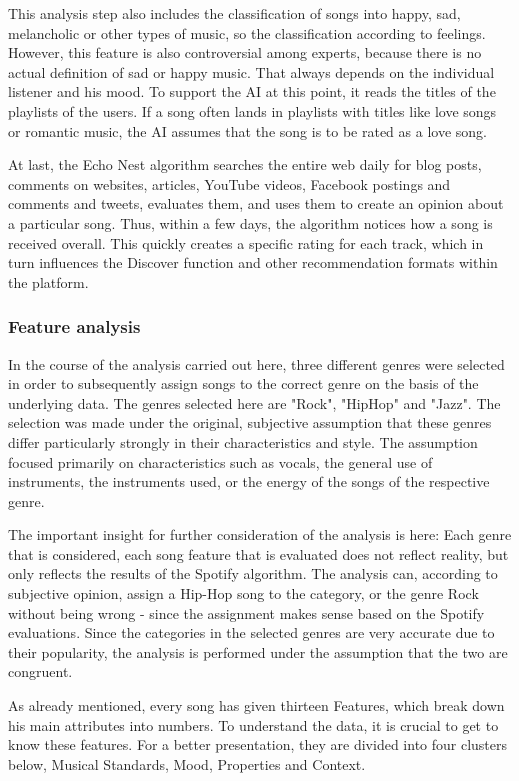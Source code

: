 This analysis step also includes the classification of songs into happy, sad,
melancholic or other types of music, so the classification according to feelings.
However, this feature is also controversial among experts, because there is no actual definition of sad or happy music. 
That always depends on the individual listener and his mood. To support the AI at this point,
it reads the titles of the playlists of the users. 
If a song often lands in playlists with titles like love songs or romantic music,
the AI assumes that the song is to be rated as a love song. 

At last, the Echo Nest algorithm searches the entire web daily for blog posts, comments on websites,
articles, YouTube videos, Facebook postings and comments and tweets, 
evaluates them, and uses them to create an opinion about a particular song.
Thus, within a few days, the algorithm notices how a song is received overall.  
This quickly creates a specific rating for each track, which in turn influences the
Discover function and other recommendation formats within the platform. 

\subsubsection{Feature analysis}
In the course of the analysis carried out here, three different genres were selected in order
to subsequently assign songs to the correct genre on the basis of the underlying data. 
The genres selected here are "Rock", "HipHop" and "Jazz". The selection was made under the original, 
subjective assumption that these genres differ particularly strongly in their characteristics and style. 
The assumption focused primarily on characteristics such as vocals, the general use of instruments,
the instruments used, or the energy of the songs of the respective genre.

The important insight for further consideration of the analysis is here:
Each genre that is considered, each song feature that is evaluated does not reflect reality, 
but only reflects the results of the Spotify algorithm. The analysis can,
according to subjective opinion, assign a Hip-Hop song to the category, 
or the genre Rock without being wrong - since the assignment makes sense based on the Spotify evaluations. 
Since the categories in the selected genres are very accurate due to their popularity,
the analysis is performed under the assumption that the two are congruent. 

As already mentioned, every song has given thirteen Features, which break down his main attributes into numbers.
To understand the data, it is crucial to get to know these features.
For a better presentation, they are divided into four clusters below, 
Musical Standards, Mood, Properties and Context.

